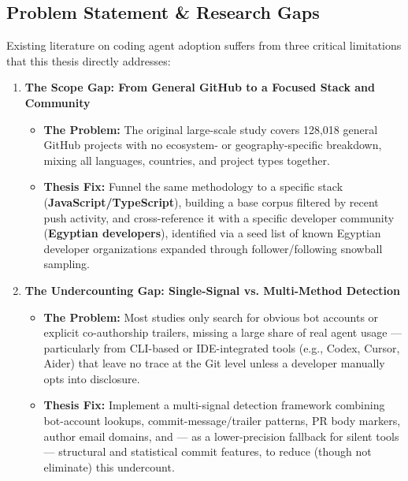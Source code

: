 \documentclass[11pt,a4paper]{article}
\begin{document}
\subsection{Problem Statement \& Research Gaps}
Existing literature on coding agent adoption suffers from three critical limitations that this thesis directly addresses:

\begin{enumerate}[leftmargin=1.5em, itemsep=6pt]
    \item \textbf{The Scope Gap: From General GitHub to a Focused Stack and Community}
    \begin{itemize}
        \item \textbf{The Problem:} The original large-scale study covers 128,018 general GitHub projects with no ecosystem- or geography-specific breakdown, mixing all languages, countries, and project types together.
        \item \textbf{Thesis Fix:} Funnel the same methodology to a specific stack (\textbf{JavaScript/TypeScript}), building a base corpus filtered by recent push activity, and cross-reference it with a specific developer community (\textbf{Egyptian developers}), identified via a seed list of known Egyptian developer organizations expanded through follower/following snowball sampling.
    \end{itemize}

    \item \textbf{The Undercounting Gap: Single-Signal vs. Multi-Method Detection}
    \begin{itemize}
        \item \textbf{The Problem:} Most studies only search for obvious bot accounts or explicit co-authorship trailers, missing a large share of real agent usage --- particularly from CLI-based or IDE-integrated tools (e.g., Codex, Cursor, Aider) that leave no trace at the Git level unless a developer manually opts into disclosure.
        \item \textbf{Thesis Fix:} Implement a multi-signal detection framework combining bot-account lookups, commit-message/trailer patterns, PR body markers, author email domains, and --- as a lower-precision fallback for silent tools --- structural and statistical commit features, to reduce (though not eliminate) this undercount.
    \end{itemize}


\end{enumerate}
\end{document}
